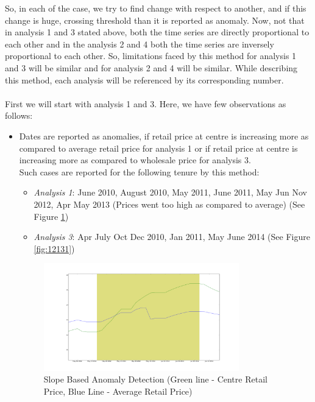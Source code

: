 \documentclass[a4paper,10pt]{report}
\begin{document}
		So, in each of the case, we try to find change with respect to another, and if this change is huge, crossing threshold than it is reported as anomaly. Now, not that in analysis 1 and 3 stated above, both the time series are directly proportional to each other and in the analysis 2 and 4 both the time series are inversely proportional to each other. So, limitations faced by this method for analysis 1 and 3 will be similar and for analysis 2 and 4 will be similar. While describing this method, each analysis will be referenced by its corresponding number.\\
		\\
		First we will start with analysis 1 and 3. Here, we have few observations as follows:
		
			
		\begin{itemize}
		
			\item Dates are reported as anomalies, if retail price at centre is increasing more as compared to average retail price for analysis 1 or if retail price at centre is increasing more as compared to wholesale price for analysis 3. \\
			Such cases are reported for the following tenure by this method:
			\begin{itemize}
				\item \textit{Analysis 1}: June 2010, August 2010, May 2011, June 2011, May Jun Nov 2012, Apr May 2013 (Prices went too high as compared to average) (See Figure \ref{fig:12111})
				\item \textit{Analysis 3}: Apr July Oct Dec 2010, Jan 2011, May June 2014 (See Figure \ref{fig:12131})
			\end{itemize}
			\begin{figure}[H]
		    	\centering
  		    	\includegraphics[width=0.8\textwidth]{graphs/12111.png}
		    	\caption{Slope Based Anomaly Detection (Green line - Centre Retail Price, Blue Line - Average Retail Price)}
		    	\label{fig:12111}
			\end{figure}
			

\end{itemize}
\end{document}
